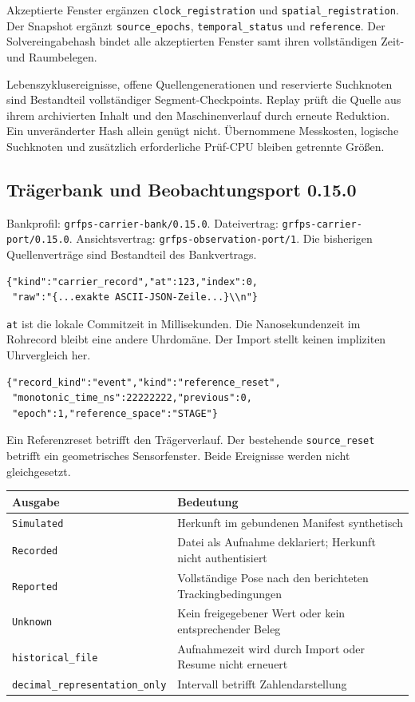 \documentclass[11pt,a4paper]{article}
\begin{document}
Akzeptierte Fenster ergänzen \texttt{clock\_registration} und
\texttt{spatial\_registration}. Der Snapshot ergänzt
\texttt{source\_epochs}, \texttt{temporal\_status} und
\texttt{reference}. Der Solvereingabehash bindet alle akzeptierten
Fenster samt ihren vollständigen Zeit- und Raumbelegen.

Lebenszyklusereignisse, offene Quellengenerationen und reservierte
Suchknoten sind Bestandteil vollständiger Segment-Checkpoints.
Replay prüft die Quelle aus ihrem archivierten Inhalt und den
Maschinenverlauf durch erneute Reduktion. Ein unveränderter Hash
allein genügt nicht. Übernommene Messkosten, logische Suchknoten
und zusätzlich erforderliche Prüf-CPU bleiben getrennte Größen.

\clearpage\subsection{Trägerbank und Beobachtungsport 0.15.0}
Bankprofil: \texttt{grfps-carrier-bank/0.15.0}.
Dateivertrag: \texttt{grfps-carrier-port/0.15.0}.
Ansichtsvertrag: \texttt{grfps-observation-port/1}.
Die bisherigen Quellenverträge sind Bestandteil des Bankvertrags.
\begin{lstlisting}
{"kind":"carrier_record","at":123,"index":0,
 "raw":"{...exakte ASCII-JSON-Zeile...}\\n"}
\end{lstlisting}
\texttt{at} ist die lokale Commitzeit in Millisekunden.
Die Nanosekundenzeit im Rohrecord bleibt eine andere Uhrdomäne.
Der Import stellt keinen impliziten Uhrvergleich her.

\begin{lstlisting}
{"record_kind":"event","kind":"reference_reset",
 "monotonic_time_ns":22222222,"previous":0,
 "epoch":1,"reference_space":"STAGE"}
\end{lstlisting}
Ein Referenzreset betrifft den Trägerverlauf. Der bestehende
\texttt{source\_reset} betrifft ein geometrisches Sensorfenster.
Beide Ereignisse werden nicht gleichgesetzt.

\begin{tabularx}{\linewidth}{@{}lY@{}}\toprule
Ausgabe & Bedeutung\\\midrule
\texttt{Simulated} & Herkunft im gebundenen Manifest synthetisch\\
\texttt{Recorded} & Datei als Aufnahme deklariert; Herkunft nicht authentisiert\\
\texttt{Reported} & Vollständige Pose nach den berichteten Trackingbedingungen\\
\texttt{Unknown} & Kein freigegebener Wert oder kein entsprechender Beleg\\
\texttt{historical\_file} & Aufnahmezeit wird durch Import oder Resume nicht erneuert\\
\texttt{decimal\_representation\_only} & Intervall betrifft Zahlendarstellung\\\bottomrule
\end{tabularx}
\end{document}
